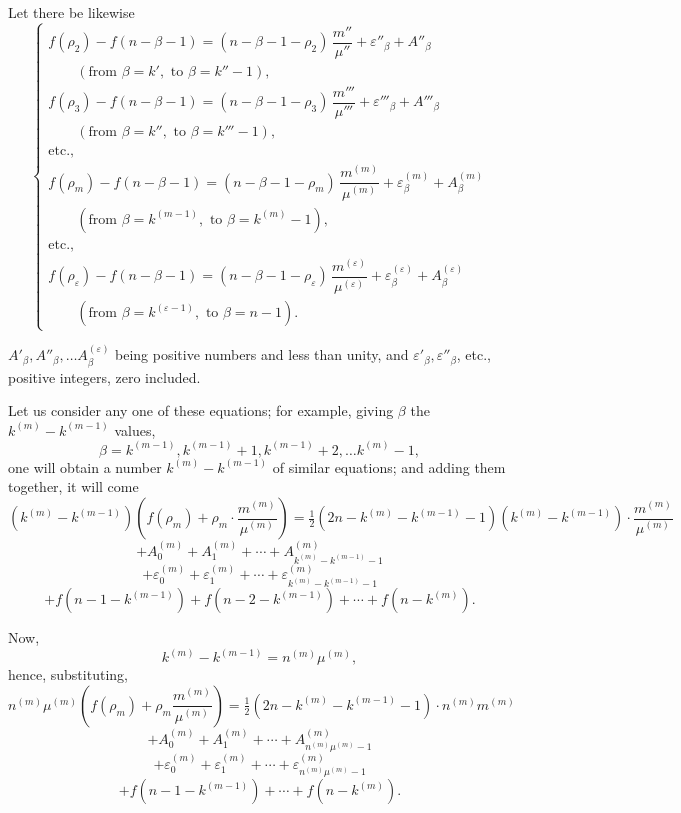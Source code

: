 \documentclass{article}
\begin{document}
Let there be likewise
\[ \begin{cases}
f(\rho_2) - f(n-\beta-1) = (n-\beta-1-\rho_2)\,\dfrac{m''}{\mu''} + \varepsilon''_\beta + A''_\beta \\
\qquad (\text{from } \beta = k', \text{ to } \beta = k''-1), \\
f(\rho_3) - f(n-\beta-1) = (n-\beta-1-\rho_3)\,\dfrac{m'''}{\mu'''} + \varepsilon'''_\beta + A'''_\beta \\
\qquad (\text{from } \beta = k'', \text{ to } \beta = k'''-1), \\
\text{etc.,} \\
f(\rho_m) - f(n-\beta-1) = (n-\beta-1-\rho_m)\,\dfrac{m^{(m)}}{\mu^{(m)}} + \varepsilon^{(m)}_\beta + A^{(m)}_\beta \\
\qquad (\text{from } \beta = k^{(m-1)}, \text{ to } \beta = k^{(m)}-1), \\
\text{etc.,} \\
f(\rho_\varepsilon) - f(n-\beta-1) = (n-\beta-1-\rho_\varepsilon)\,\dfrac{m^{(\varepsilon)}}{\mu^{(\varepsilon)}} + \varepsilon^{(\varepsilon)}_\beta + A^{(\varepsilon)}_\beta \\
\qquad (\text{from } \beta = k^{(\varepsilon-1)}, \text{ to } \beta = n-1).
\end{cases} \tag{84} \]

$A'_\beta, A''_\beta, \ldots A^{(\varepsilon)}_\beta$ being positive numbers and less than unity, and $\varepsilon'_\beta, \varepsilon''_\beta$, etc., positive integers, zero included.

Let us consider any one of these equations; for example, giving $\beta$ the $k^{(m)}-k^{(m-1)}$ values,
\[ \beta = k^{(m-1)}, k^{(m-1)}+1, k^{(m-1)}+2, \ldots k^{(m)}-1, \]
one will obtain a number $k^{(m)} - k^{(m-1)}$ of similar equations; and adding them together, it will come
\[ (k^{(m)}-k^{(m-1)})\left(f(\rho_m)+\rho_m \cdot \frac{m^{(m)}}{\mu^{(m)}}\right) = \tfrac{1}{2}(2n-k^{(m)}-k^{(m-1)}-1)(k^{(m)}-k^{(m-1)}) \cdot \frac{m^{(m)}}{\mu^{(m)}} \]
\[ + A_0^{(m)} + A_1^{(m)} + \cdots + A_{k^{(m)}-k^{(m-1)}-1}^{(m)} \]
\[ + \varepsilon_0^{(m)} + \varepsilon_1^{(m)} + \cdots + \varepsilon_{k^{(m)}-k^{(m-1)}-1}^{(m)} \]
\[ + f(n-1-k^{(m-1)}) + f(n-2-k^{(m-1)}) + \cdots + f(n-k^{(m)}). \]

Now,
\[ k^{(m)} - k^{(m-1)} = n^{(m)}\mu^{(m)}, \]
hence, substituting,
\[ n^{(m)}\mu^{(m)}\left(f(\rho_m)+\rho_m \frac{m^{(m)}}{\mu^{(m)}}\right) = \tfrac{1}{2}(2n-k^{(m)}-k^{(m-1)}-1) \cdot n^{(m)}m^{(m)} \]
\[ + A_0^{(m)}+A_1^{(m)}+\cdots+A_{n^{(m)}\mu^{(m)}-1}^{(m)} \]
\[ + \varepsilon_0^{(m)}+\varepsilon_1^{(m)}+\cdots+\varepsilon_{n^{(m)}\mu^{(m)}-1}^{(m)} \]
\[ + f(n-1-k^{(m-1)}) + \cdots + f(n-k^{(m)}). \]
\end{document}

